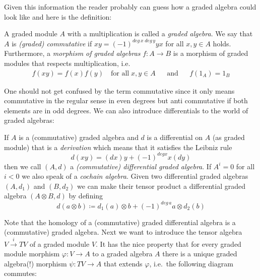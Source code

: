  Given this information the reader probably can guess how a graded algebra could look like and here is the definition:
\begin{Definition}
 A graded module $A$ with a multiplication is called a \emph{graded algebra}. We say that $A$ is \emph{(graded) commutative} if
 $xy = (-1)^{deg \, x \; deg \, y} yx$ for all $x,y \in A$ holds. Furthermore, a \emph{morphism of graded algebras} 
 $f \colon A \to B$ is a morphism of graded modules that respects multiplication, i.e.\ 
 \begin{align*}
 f(xy) = f(x)f(y) \quad \text{for all} \; x,y \in A & & \text{and} & & f(1_A) = 1_B 
 \end{align*}

\end{Definition}

One should not get confused by the term commutative since it only means commutative in the regular sense in even degrees but
anti commutative if both elements are in odd degrees.
We can also introduce differentials to the world of graded algebras:
\begin{Definition}
 If $A$ is a (commutative) graded algebra and $d$ is a differential on $A$ (as graded module) that is a \emph{derivation} which means
 that it satisfies the Leibniz rule
 $$ d(xy) = (dx)y + (-1)^{deg x} x(dy)$$
 then we call $(A,d)$ a \emph{(commutative) differential graded algebra}. If $A^i = 0$ for all $i < 0$ we also
 speak of a \emph{cochain algebra}. \newline
 Given two differential graded algebras $(A,d_1)$ and $(B, d_2)$ we can make their tensor product a 
 differential graded algebra $(A \otimes B, d)$ by defining 
 $$ d(a \otimes b) \coloneqq d_1(a) \otimes b + (-1)^{deg \, a} a \otimes d_2(b)$$
\end{Definition}

Note that the homology of a (commutative) graded differential algebra is a (commutative) graded algebra. \newline
Next we want to introduce the tensor algebra $V \overset{i}{\to} TV$ of a graded module $V$. It has the nice property
that for every graded module morphism $\varphi \colon V \to A$ to a graded algebra $A$ there is a unique 
graded algebra(!) morphism $\psi \colon TV \to A$ that extends $\varphi$, i.e.\ the following diagram commutes:

\centerline{ 
}

